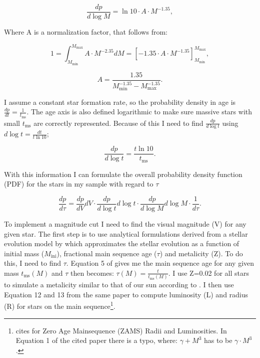 \documentclass[a4paper,10pt]{article}
\begin{document}
 \begin{equation}
  \frac{dp}{d\log M}=\ln 10 \cdot A\cdot M^{-1.35},
 \end{equation}
 
 Where A is a normalization factor, that follows from: 
 
 \begin{equation}
  1=\int_{M_{\mathrm{min}}}^{M_{\mathrm{max}}}A\cdot M^{-2.35} dM =\left[ -1.35\cdot A\cdot M^{-1.35}\right]_{M_{\mathrm{min}}}^{M_{\mathrm{max}}},
 \end{equation}
 
 \begin{equation}
  A= \frac{1.35}{M_{\mathrm{min}}^{-1.35}-M_{\mathrm{max}}^{-1.35}}.
 \end{equation}
 
 I assume a constant star formation rate, so the probability density in age is $\frac{dp}{dt}=\frac{1}{t_{\mathrm{ms}}}$. 
 The age axis is also defined logarithmic to make sure massive stars with small $t_{\mathrm{ms}}$ are correctly represented.
 Because of this I need to find $\frac{dp}{d\log t}$ using $d\log t=\frac{dt}{t \ln 10}$; 

 \begin{equation}
  \frac{dp}{d\log t}=\frac{t\ln 10}{t_{\mathrm{ms}}}.
 \end{equation}

 With this information I can formulate the overall probability density function (PDF) for the stars in my sample with regard to $\tau$
 
 \begin{equation}
  \frac{dp}{d\tau}=\frac{dp}{dV}dV \cdot \frac{dp}{d\log t}d\log t \cdot \frac{dp}{d\log M}d\log M\cdot \frac{1}{d\tau}.
 \end{equation}
  
 
 To implement a magnitude cut I need to find the visual magnitude (V) for any given star. 
 The first step is to use analytical formulations derived from a stellar evolution model by \citet{2000MNRAS.315..543H} which approximates the
 stellar evolution as a function of initial mass ($M_{\mathrm{ini}}$), fractional main sequence age ($\tau$) and metalicity (Z).
 To do this, I need to find $\tau$. Equation 5 of \citep{2000MNRAS.315..543H} gives me the main sequence age for any given mass
 $t_{\mathrm{ms}}(M)$ and $\tau$ then becomes: $\tau(M)=\frac{t}{t_{\mathrm{ms}}(M)}$. I use Z=0.02 for all stars to simulate a metalicity
 similar to that of our sun according to \citet*{1998SSRv...85..161G}.
 I then use Equation 12 and 13 from the same paper to compute luminosity (L) and radius (R) for stars on the main sequence\footnote{
 \citet{2000MNRAS.315..543H} cites \citet*{1996MNRAS.281..257T} for Zero Age Mainsequence (ZAMS) Radii and Luminosities. 
 In Equation 1 of the cited paper there is a typo, where: $\gamma + M^3$ has to be $\gamma \cdot M^3$.}. \\
 
\end{document}
